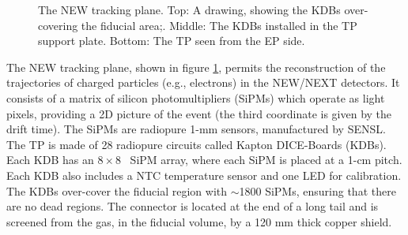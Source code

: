 \begin{figure}[hpt!]
\caption{The NEW tracking plane. Top: A drawing, showing the KDBs over-covering the fiducial area;.
Middle: The KDBs installed in the TP support plate. Bottom: The TP seen from the EP side.} \label{fig:NTP}
\end{figure}

The NEW tracking plane, shown in figure \ref{fig:NTP}, permits the reconstruction of the trajectories of charged particles (e.g., electrons) in the NEW/NEXT detectors. It consists of a matrix of silicon photomultipliers (SiPMs) which operate as light pixels, providing a 2D picture of the event (the third coordinate is given by the drift time). The SiPMs are radiopure 1-mm sensors, manufactured by SENSL. The TP is made of 28 radiopure circuits called Kapton DICE-Boards (KDBs). Each KDB has an $8\times8$~ SiPM array, where each SiPM is placed at a 1-cm pitch. Each KDB also includes a NTC temperature sensor and one LED for calibration. The KDBs over-cover the fiducial region with $\sim$1800 SiPMs, ensuring that there are no dead regions. The connector is located at the end of a long tail and is screened from the gas, in the fiducial volume, by a 120 mm thick copper shield.

%
%
%
%

